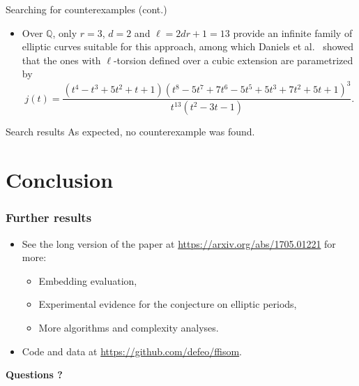 \documentclass[francais]{beamer}
\def\Q {\ensuremath{\mathbb{Q}}}
\begin{document}
\begin{frame}{Searching for counterexamples (cont.)}
  \begin{itemize}
    \item
  Over $\Q$, only $r = 3$, $d = 2$ and $\ell = 2 d r + 1 = 13$ provide
  an infinite family of elliptic curves suitable for this approach,
  among which Daniels et al.~\cite{daniels_torsion_2015} showed
  that the ones with $\ell$-torsion defined over a cubic extension
  are parametrized by
  {\footnotesize
  \[
    j(t)=\frac{\left(t^4-t^3+5 t^2 + t + 1\right) \left(t^8 - 5 t^7 + 7 t^6 - 5 t^5 + 5 t^3 + 7 t^2 + 5 t + 1\right)^3}{t^{13} \left(t^2 -3 t - 1\right)}.
  \]
  }
\end{itemize}
\bigskip
\begin{block}{Search results}
As expected, no counterexample was found.
\end{block}

\end{frame}

\section{Conclusion}

\begin{frame}\frametitle{Further results}
      \begin{itemize}
    \item See the long version of the paper at \url{https://arxiv.org/abs/1705.01221} for more:
      \begin{itemize}
      \item Embedding evaluation,
      \item Experimental evidence for the conjecture on elliptic periods,
      \item More algorithms and complexity analyses.
      \end{itemize}
      \medskip
    \item Code and data at \url{https://github.com/defeo/ffisom}.
    \end{itemize}
\end{frame}

\begin{frame}[standout]
\Huge \textbf{Questions ?}
\end{frame}

\begin{frame}[allowframebreaks]\frametitle{\refname}
  \scriptsize
    
    
\end{frame}
\end{document}
